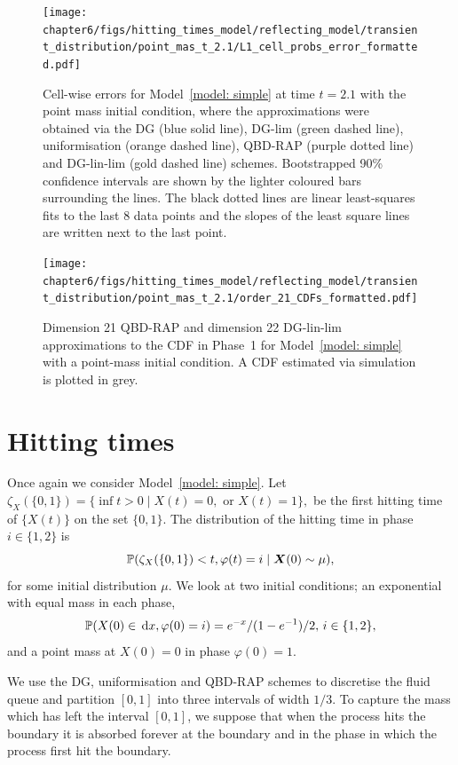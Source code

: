 \begin{figure}[h]
	\centering
	\texttt{[image: chapter6/figs/hitting\_times\_model/reflecting\_model/transient\_distribution/point\_mas\_t\_2.1/L1\_cell\_probs\_error\_formatted.pdf]}
	\caption{Cell-wise errors for Model~\ref{model: simple} at time \(t=2.1\) with the point mass initial condition, where the approximations were obtained via the DG (blue solid line), DG-lim (green dashed line), uniformisation (orange dashed line), QBD-RAP (purple dotted line) and DG-lin-lim (gold dashed line) schemes. Bootstrapped 90\% confidence intervals are shown by the lighter coloured bars surrounding the lines. The black dotted lines are linear least-squares fits to the last 8 data points and the slopes of the least square lines are written next to the last point.} 
	\label{fig: reflecting transient pm t2.1} 
\end{figure}
\begin{figure}[h]
	\centering
	\texttt{[image: chapter6/figs/hitting\_times\_model/reflecting\_model/transient\_distribution/point\_mas\_t\_2.1/order\_21\_CDFs\_formatted.pdf]}
	\caption{Dimension 21 QBD-RAP and dimension 22 DG-lin-lim approximations to the CDF in Phase~1 for Model~\ref{model: simple} with a point-mass initial condition. A CDF estimated via simulation is plotted in grey.}  
	\label{fig: reflecting transient pm t2.1 cdfs} 
\end{figure}

\FloatBarrier
\section{Hitting times}\label{sec: return approx}
Once again we consider Model~\ref{model: simple}. Let \(\zeta_{X}(\{0,1\}) = \{\inf t>0 \mid X(t)=0, \mbox{ or }X(t)=1\},\) be the first hitting time of \(\{X(t)\}\) on the set \(\{0,1\}\). The distribution of the hitting time in phase \(i\in\{1,2\}\) is 
\begin{equation}\label{eqn: hit cdf}\mathbb P(\zeta_{X}(\{0,1\}) < t, \varphi(t)=i\mid \boldsymbol X(0)\sim \mu),\end{equation}
for some initial distribution \(\mu\). We look at two initial conditions; an exponential with equal mass in each phase, 
\[\mathbb P(X(0)\in\, \mathrm{d} x,\varphi(0)=i) = e^{-x}/(1-e^{-1})/2,\,i\in\{1,2\},\]
and a point mass at \(X(0)=0\) in phase \(\varphi(0)=1\). 

We use the DG, uniformisation and QBD-RAP schemes to discretise the fluid queue and partition \([0,1]\) into three intervals of width \(1/3\). To capture the mass which has left the interval \([0,1]\), we suppose that when the process hits the boundary it is absorbed forever at the boundary and in the phase in which the process first hit the boundary. 

